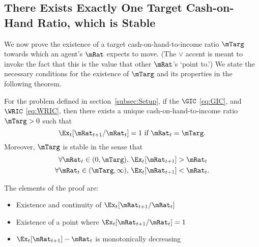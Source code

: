 \documentclass[BufferStockTheory]{subfiles}
\begin{document}
\hypertarget{onetarget}{}

\subsection{There Exists Exactly One Target Cash-on-Hand Ratio,
  which is Stable}

\label{subsec:onetarget}
\hypertarget{TheoremTarget}{}

We now prove the existence of a target cash-on-hand-to-income ratio $\mTarg$ towards which an agent's $\mRat$ expects to move. (The $\vee$ accent is meant to invoke the fact that this is the value that other $\mRat$'s `point to.') We state the necessary conditions for the existence of $\mTarg$ and its properties in the following theorem.

\begin{theorem}
  \label{thm:target} For the problem defined in section~\ref{subsec:Setup}, 
  if the $\GIC$ \eqref{eq:GIC}, and $\WRIC$ \eqref{eq:WRIC}, 
 then there exists a unique cash-on-hand-to-income ratio $\mTarg>0$ such that
  \begin{equation}  
    \Ex_t [{\mRat}_{t+1}/\mRat_t] = 1 \mbox{~if~} \mRat_t = \mTarg. 
    \label{eq:mTarget}
  \end{equation}
  Moreover, $\mTarg$ is stable in the sense that
  \begin{equation}\begin{gathered}\begin{aligned}\label{eq:stability}
    \forall {\mRat}_t\in(0,\mTarg),      \,\,& \Ex_t [{\mRat}_{t+1}] > {\mRat}_t  \\
    \forall {\mRat}_t\in(\mTarg,\infty), \,\,& \Ex_t [{\mRat}_{t+1}] < {\mRat}_t. \notag
  \end{aligned}\end{gathered}\end{equation}

\end{theorem}

The elements of the proof are:
\begin{itemize}
\item Existence and continuity of $\Ex_t [{\mRat}_{t+1}/\mRat_t]$
\item Existence of a point where $\Ex_t [{\mRat}_{t+1}/\mRat_t] = 1$
\item $\Ex_t [{\mRat}_{t+1}]-\mRat_{t}$ is monotonically decreasing
\end{itemize}
\end{document}
